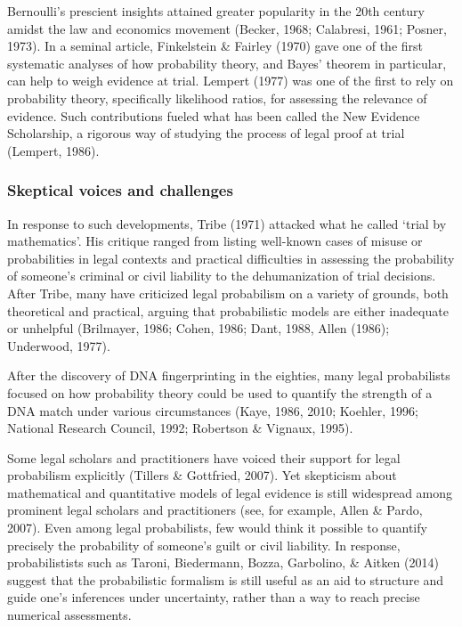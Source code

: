 \documentclass[11pt,dvipsnames,enabledeprecatedfontcommands]{scrartcl}
\begin{document}
Bernoulli's prescient insights attained greater popularity in the 20th
century amidst the law and economics movement (Becker, 1968; Calabresi,
1961; Posner, 1973). In a seminal article, Finkelstein \& Fairley (1970)
gave one of the first systematic analyses of how probability theory, and
Bayes' theorem in particular, can help to weigh evidence at trial.
Lempert (1977) was one of the first to rely on probability theory,
specifically likelihood ratios, for assessing the relevance of evidence.
Such contributions fueled what has been called the New Evidence
Scholarship, a rigorous way of studying the process of legal proof at
trial (Lempert, 1986).

\subsubsection{Skeptical voices and
challenges}\label{skeptical-voices-and-challenges}

In response to such developments, Tribe (1971) attacked what he called
`trial by mathematics'. His critique ranged from listing well-known
cases of misuse or probabilities in legal contexts and practical
difficulties in assessing the probability of someone's criminal or civil
liability to the dehumanization of trial decisions. After Tribe, many
have criticized legal probabilism on a variety of grounds, both
theoretical and practical, arguing that probabilistic models are either
inadequate or unhelpful (Brilmayer, 1986; Cohen, 1986; Dant, 1988, Allen
(1986); Underwood, 1977).

After the discovery of DNA fingerprinting in the eighties, many legal
probabilists focused on how probability theory could be used to quantify
the strength of a DNA match under various circumstances (Kaye, 1986,
2010; Koehler, 1996; National Research Council, 1992; Robertson \&
Vignaux, 1995).

Some legal scholars and practitioners have voiced their support for
legal probabilism explicitly (Tillers \& Gottfried, 2007). Yet
skepticism about mathematical and quantitative models of legal evidence
is still widespread among prominent legal scholars and practitioners
(see, for example, Allen \& Pardo, 2007). Even among legal probabilists,
few would think it possible to quantify precisely the probability of
someone's guilt or civil liability. In response, probabilistists such as
Taroni, Biedermann, Bozza, Garbolino, \& Aitken (2014) suggest that the
probabilistic formalism is still useful as an aid to structure and guide
one's inferences under uncertainty, rather than a way to reach precise
numerical assessments.
\end{document}
